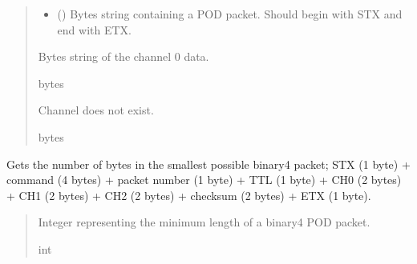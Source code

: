 \documentclass[letterpaper,10pt,english]{sphinxmanual}
\begin{document}
\begin{fulllineitems}
\begin{fulllineitems}
\begin{quote}
\begin{description}
\begin{itemize}
\item {} 
\sphinxAtStartPar
{} () \textendash{} Bytes string containing a POD packet. Should begin with STX and                 end with ETX.

\end{itemize}

\sphinxAtStartPar
Bytes string of the channel 0 data.

\sphinxAtStartPar
bytes

\sphinxAtStartPar
Channel does not exist.

\sphinxAtStartPar
bytes

\end{description}\end{quote}

\end{fulllineitems}


\begin{fulllineitems}
\label{\detokenize{PodApi.Packets:PodApi.Packets.Binary4.PacketBinary4.GetMinimumLength}}
\pysigstartsignatures
{}
\pysigstopsignatures
\sphinxAtStartPar
Gets the number of bytes in the smallest possible binary4 packet;         STX (1 byte) + command (4 bytes) + packet number (1 byte) + TTL (1 byte) +         CH0 (2 bytes) + CH1 (2 bytes) + CH2 (2 bytes) + checksum (2 bytes) + ETX (1 byte).
\begin{quote}\begin{description}
\sphinxAtStartPar
Integer representing the minimum length of a binary4 POD packet.

\sphinxAtStartPar
int

\end{description}\end{quote}

\end{fulllineitems}



\end{fulllineitems}
\end{document}
